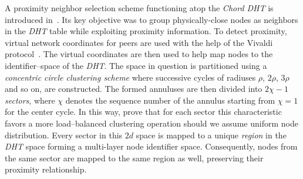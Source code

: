 
A proximity neighbor selection scheme functioning atop 
the \emph{Chord DHT} is introduced in~\cite{DLTZZ2006}.
Its key objective was to group physically-close nodes as 
neighbors in the \emph{DHT} table while exploiting proximity information.
To detect proximity, virtual network coordinates for 
peers are used with the help of the Vivaldi protocol~\cite{cox_vivaldi_2004}. 
The virtual coordinates are then used to help map nodes to 
the identifier--space of the \emph{DHT}.
The space in question is partitioned using a 
\emph{concentric circle clustering scheme} where successive cycles of
radiuses $\rho$, $2\rho$, $3\rho$ and so on, are constructed. 
The formed annuluses are then divided into 
$2\chi-1$ \emph{sectors}, where $\chi$ denotes the
sequence number of the annulus starting from $\chi = 1$ 
for the center cycle. 
In this way, 
\cite{DLTZZ2006} prove that for each sector
this characteristic favors a more load--balanced clustering operation
should we assume uniform node distribution.
Every sector in this $2d$ space is mapped to 
a unique \emph{region} in the \emph{DHT} space forming a
multi-layer node identifier space.  
Consequently, nodes from the same
sector are mapped to the same region as well, 
preserving their proximity relationship. 

